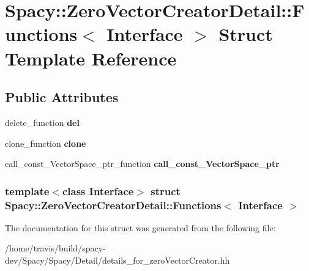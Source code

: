 \hypertarget{structSpacy_1_1ZeroVectorCreatorDetail_1_1Functions}{\section{\-Spacy\-:\-:\-Zero\-Vector\-Creator\-Detail\-:\-:\-Functions$<$ \-Interface $>$ \-Struct \-Template \-Reference}
\label{structSpacy_1_1ZeroVectorCreatorDetail_1_1Functions}
}
\subsection*{\-Public \-Attributes}
\begin{DoxyCompactItemize}
\item 
\hypertarget{structSpacy_1_1ZeroVectorCreatorDetail_1_1Functions_af4fd9ccf19d29bc5055f41cc4f849a02}{delete\-\_\-function {\bfseries del}}\label{structSpacy_1_1ZeroVectorCreatorDetail_1_1Functions_af4fd9ccf19d29bc5055f41cc4f849a02}

\item 
\hypertarget{structSpacy_1_1ZeroVectorCreatorDetail_1_1Functions_a304a6ff7905a02917e14933ef299f5a6}{clone\-\_\-function {\bfseries clone}}\label{structSpacy_1_1ZeroVectorCreatorDetail_1_1Functions_a304a6ff7905a02917e14933ef299f5a6}

\item 
\hypertarget{structSpacy_1_1ZeroVectorCreatorDetail_1_1Functions_a8b7c9cdb57e03273f0b2eda63e18c33a}{call\-\_\-const\-\_\-\-Vector\-Space\-\_\-ptr\-\_\-function {\bfseries call\-\_\-const\-\_\-\-Vector\-Space\-\_\-ptr}}\label{structSpacy_1_1ZeroVectorCreatorDetail_1_1Functions_a8b7c9cdb57e03273f0b2eda63e18c33a}

\end{DoxyCompactItemize}
\subsubsection*{template$<$class \-Interface$>$ struct Spacy\-::\-Zero\-Vector\-Creator\-Detail\-::\-Functions$<$ Interface $>$}



\-The documentation for this struct was generated from the following file\-:\begin{DoxyCompactItemize}
\item 
/home/travis/build/spacy-\/dev/\-Spacy/\-Spacy/\-Detail/details\-\_\-for\-\_\-zero\-Vector\-Creator.\-hh\end{DoxyCompactItemize}
